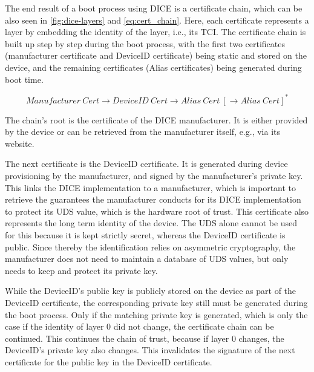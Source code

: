 
The end result of a boot process using DICE is a certificate chain, which can be also seen in \autoref{fig:dice-layers} and \autoref{eq:cert_chain}.
Here, each certificate represents a layer by embedding the identity of the layer, i.e., its TCI\@.
The certificate chain is built up step by step during the boot process, with the first two certificates (manufacturer certificate and DeviceID certificate) being static and stored on the device, and the remaining certificates (Alias certificates) being generated during boot time.

\begin{equation}
  \label{eq:cert_chain}
  Manufacturer\ Cert \rightarrow DeviceID\ Cert \rightarrow Alias\ Cert\ [\rightarrow Alias\ Cert]^*
\end{equation}

The chain's root is the certificate of the DICE manufacturer. It is either provided by the device or can be retrieved from the manufacturer itself, e.g., via its website.


The next certificate is the DeviceID certificate.
It is generated during device provisioning by the manufacturer, and signed by the manufacturer's private key.
This links the DICE implementation to a manufacturer, which is important to retrieve the guarantees the manufacturer conducts for its DICE implementation to protect its UDS value, which is the hardware root of trust.
This certificate also represents the long term identity of the device.
The UDS alone cannot be used for this because it is kept strictly secret, whereas the DeviceID certificate is public.
Since thereby the identification relies on asymmetric cryptography, the manufacturer does not need to maintain a database of UDS values, but only needs to keep and protect its private key.


While the DeviceID's public key is publicly stored on the device as part of the DeviceID certificate, the corresponding private key still must be generated during the boot process.
Only if the matching private key is generated, which is only the case if the identity of layer 0 did not change, the certificate chain can be continued.
This continues the chain of trust, because if layer 0 changes, the DeviceID's private key also changes.
This invalidates the signature of the next certificate for the public key in the DeviceID certificate.

